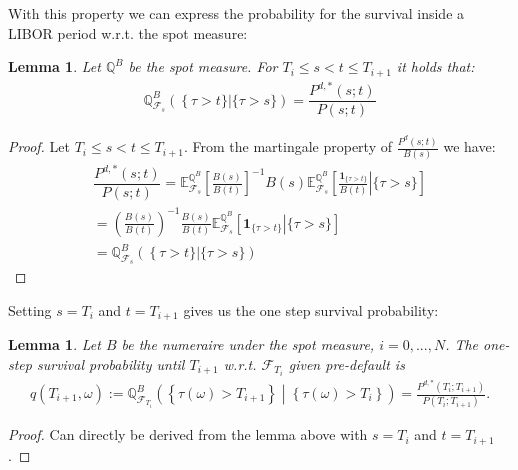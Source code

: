 \documentclass[12pt]{article}
\newtheorem{lemma}[theorem]{Lemma}
\begin{document}
	With this property we can express the probability for the survival inside a LIBOR period w.r.t. the spot measure:
	\begin{lemma}
		Let $\mathbb{Q}^B$ be the spot measure. For $T_i \le s < t \le T_{i+1}$ it holds that:
		\begin{align*}
			\mathbb{Q}^B_{\mathcal{F}_s}\left(\left  \{\tau > t\} \right| \{\tau > s\}\right) = \dfrac{P^{d,*}(s;t)}{P(s;t)}
		\end{align*}
	\end{lemma}
	\begin{proof}
		Let $T_i \le s < t \le T_{i+1}$. From the martingale property of $\frac{P^{d}(s;t)}{B(s)}$ we have:
		\begin{align*}
				\dfrac{P^{d,*}(s;t)}{P(s;t)} = \mathbb{E}^{\mathbb{Q}^B}_{\mathcal{F}_{s}}\left[\frac{B(s)}{B(t)}\right]^{-1} B(s)\mathbb{E}^{\mathbb{Q}^B}_{\mathcal{F}_{s}}\left[\left.\frac{\mathbf{1}_{\{\tau > t\}}}{B(t)} \right| \{\tau> s\}\right]\\
				= \left(\frac{B(s)}{B(t)}\right)^{-1} \frac{B(s)}{B(t)} \mathbb{E}^{\mathbb{Q}^B}_{\mathcal{F}_{s}}\left[ \left. \mathbf{1}_{\{\tau > t\}} \right| \{\tau> s\} \right]\\
				= \mathbb{Q}^B_{\mathcal{F}_s}\left(\left  \{\tau > t\} \right| \{\tau > s\}\right)
		\end{align*}
	\end{proof}
	Setting $s=T_i$ and $t=T_{i+1}$ gives us the one step survival probability:
	\begin{lemma}
		Let $B$ be the numeraire under the spot measure, $i = 0, ..., N$.
		The one-step survival probability until $T_{i+1}$ w.r.t. $\mathcal{F}_{T_i}$ given pre-default is
		\begin{align}
			q(T_{i+1}, \omega) := \mathbb{Q}^B_{\mathcal{F}_{T_i}}\left( \left.\left\{\tau(\omega) > T_{i+1} \right\}  \;\right|\; \left\{\tau(\omega) > T_{i} \right\} \right) = \frac{P^{d,*}(T_i;T_{i+1})}{P(T_i;T_{i+1})}. \label{eq:oneStepSProbwrtF}
		\end{align}
	\end{lemma}
	\begin{proof}
		Can directly be derived from the lemma above with $s=T_i$ and $t=T_{i+1}$.
	\end{proof}
	
	
	
	
	
\end{document}
